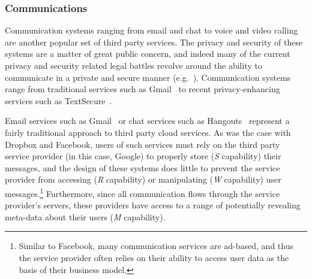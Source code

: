 \subsubsection{Communications}

Communication systems ranging from email and chat to voice and video
calling are another popular set of third party services. The privacy
and security of these systems are a matter of great public concern,
and indeed many of the current privacy and security related legal
battles revolve around the ability to communicate in a private and
secure manner (e.g.~\cite{apple-fbiletter, greenwald-prism,
  levsion-lavabit}). Communication systems range from traditional
services such as Gmail~\cite{google-gmail} to recent privacy-enhancing
services such as TextSecure~\cite{otr-advanced-ratchet}.

Email services such as Gmail~\cite{google-gmail} or chat services such
as Hangouts~\cite{google-hangouts} represent a fairly traditional
approach to third party cloud services. As was the case with Dropbox
and Facebook, users of such services must rely on the third party
service provider (in this case, Google) to properly store (\emph{S}
capability) their messages, and the design of these systems does
little to prevent the service provider from accessing (\emph{R}
capability) or manipulating (\emph{W} capability) user
messages.\footnote{Similar to Facebook, many communication services
  are ad-based, and thus the service provider often relies on their
  ability to access user data as the basis of their business model.}
Furthermore, since all communication flows through the service
provider's servers, these providers have access to a range of
potentially revealing meta-data about their users (\emph{M}
capability).

